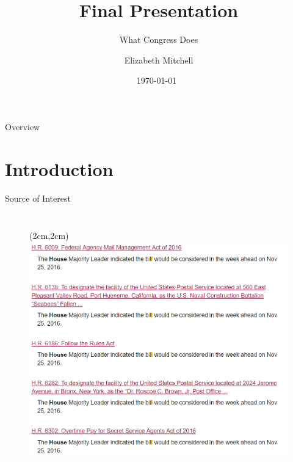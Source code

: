 \documentclass[12pt]{beamer}
\title{Final Presentation}
\subtitle{What Congress Does}
\author{Elizabeth Mitchell}
\date{ \today\ }
\begin{document}
\begin{frame}
	\titlepage
\end{frame}

\begin{frame}{Overview}
	\tableofcontents
\end{frame}

\section{Introduction}
\begin{frame}{Source of Interest}
	\begin{columns}
			\begin{figure}[ht]
				\begin{center}
					\begin{textblock*}{5cm}(2cm,2cm)
					\includegraphics[scale=.6]{houseactivity.png}
					\end{textblock*}
				\end{center}
			\end{figure}
	\end{columns}
\end{frame}
\end{document}
